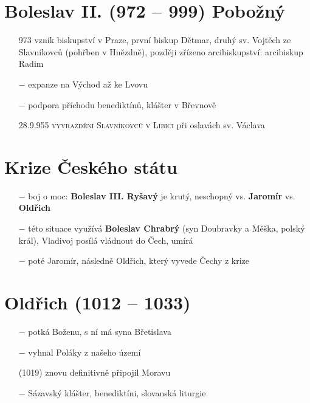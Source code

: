 \documentclass{article}
\begin{document}
\section*{Boleslav II. (972 -- 999) Pobožný}
\begin{itemize}
    \vspace{-0.5em}
    \setlength\itemsep{0.15em}
    \item[973] vznik biskupství v Praze, první biskup Dětmar, druhý sv. Vojtěch ze Slavníkovců (pohřben v Hnězdně), později zřízeno arcibiskupství: arcibiskup Radim
    \item[$-$] expanze na Východ až ke Lvovu
    \item[$-$] podpora příchodu benediktínů, klášter v Břevnově
    \item[28.9.955] \textsc{vyvraždění Slavníkovců v Libici} při oslavách sv. Václava
\end{itemize}

\section*{Krize Českého státu}
\begin{itemize}
    \vspace{-0.5em}
    \setlength\itemsep{0.15em}
    \item[$-$] boj o moc: \textbf{Boleslav III. Ryšavý} je krutý, neschopný vs. \textbf{Jaromír} vs. \textbf{Oldřich}
    \item[$-$] této situace využívá \textbf{Boleslav Chrabrý} (syn Doubravky a Měška, polský král), Vladivoj posílá vládnout do Čech, umírá
    \item[$-$] poté Jaromír, následně Oldřich, který vyvede Čechy z krize
\end{itemize}

\section*{Oldřich (1012 -- 1033)}
\begin{itemize}
    \vspace{-0.5em}
    \setlength\itemsep{0.15em}
    \item[$-$] potká Boženu, s ní má syna Břetislava
    \item[$-$] vyhnal Poláky z našeho území
    \item[(1019)] znovu definitivně připojil Moravu
    \item[$-$] Sázavský klášter, benediktíni, slovanská liturgie
\end{itemize}
\end{document}

